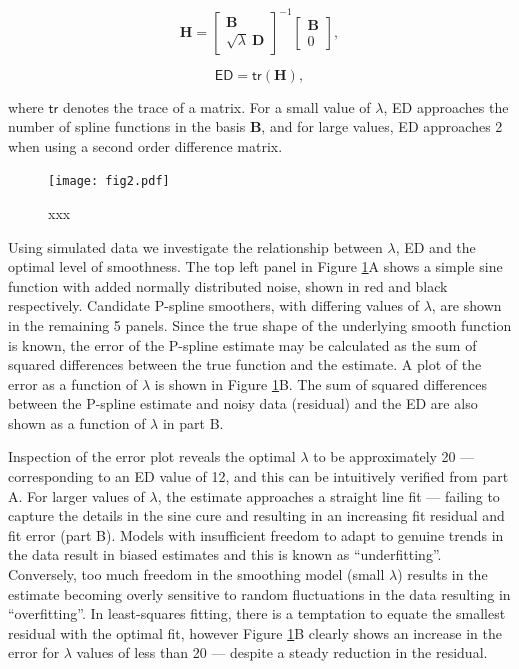 \documentclass[num-refs]{wiley-article}
\begin{document}
\begin{equation}
  \mathbf{H} =
  \begin{bmatrix}
    \mathbf{B} \\ \sqrt{\lambda}\ \mathbf{D}
  \end{bmatrix}^{-1}
  \begin{bmatrix}
    \mathbf{B} \\ 0
  \end{bmatrix},
\end{equation}

\begin{equation}
  \textsf{ED} = \textsf{tr}(\mathbf{H}),
\end{equation}

where $\textsf{tr}$ denotes the trace of a matrix. For a small value of $\lambda$, ED approaches the number of spline functions in the basis $\mathbf{B}$, and for large values, ED approaches 2 when using a second order difference matrix.

\begin{figure}
  \begin{center}
    \texttt{[image: fig2.pdf]}
    \caption{xxx}
    \label{pspline_error}
  \end{center}
\end{figure}

Using simulated data we investigate the relationship between $\lambda$, ED and the optimal level of smoothness. The top left panel in Figure \ref{pspline_error}A shows a simple sine function with added normally distributed noise, shown in red and black respectively. Candidate P-spline smoothers, with differing values of $\lambda$, are shown in the remaining 5 panels. Since the true shape of the underlying smooth function is known, the error of the P-spline estimate may be calculated as the sum of squared differences between the true function and the estimate. A plot of the error as a function of $\lambda$ is shown in Figure \ref{pspline_error}B. The sum of squared differences between the P-spline estimate and noisy data (residual) and the ED are also shown as a function of $\lambda$ in part B.

Inspection of the error plot reveals the optimal $\lambda$ to be approximately 20 --- corresponding to an ED value of 12, and this can be intuitively verified from part A. For larger values of $\lambda$, the estimate approaches a straight line fit --- failing to capture the details in the sine cure and resulting in an increasing fit residual and fit error (part B). Models with insufficient freedom to adapt to genuine trends in the data result in biased estimates and this is known as ``underfitting''. Conversely, too much freedom in the smoothing model (small $\lambda$) results in the estimate becoming overly sensitive to random fluctuations in the data resulting in ``overfitting''. In least-squares fitting, there is a temptation to equate the smallest residual with the optimal fit, however Figure \ref{pspline_error}B clearly shows an increase in the error for $\lambda$ values of less than 20 --- despite a steady reduction in the residual.
\end{document}

